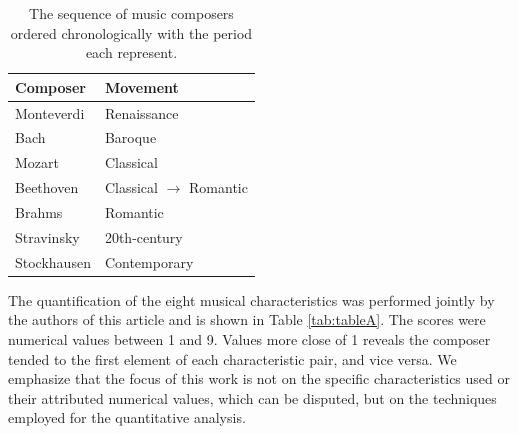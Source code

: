\documentclass[
 aip,
 jmp,
 amsmath,amssymb,
 reprint,
]{revtex4-1}
\begin{document}
\begin{table}[ht]
\caption{\label{tab:table0} The sequence of music composers ordered chronologically
with the period each represent.}

\begin{tabular}{|l||l|}
\hline

 Composer       &  Movement \\ \hline

 Monteverdi      & Renaissance \\
 Bach            & Baroque \\
 Mozart          & Classical \\
 Beethoven       & Classical $\to$ Romantic \\
 Brahms          & Romantic \\
 Stravinsky      & 20th-century \\
 Stockhausen     & Contemporary\\

\hline
\end{tabular}
\end{table}

The quantification of the eight musical
characteristics was performed jointly by the authors of this
article and is shown in Table \ref{tab:tableA}. The scores were
numerical values between 1 and 9. Values more close of 1 reveals the
composer tended to the first element of each characteristic pair, and
vice versa. We emphasize that the focus of this work is not on the specific 
characteristics used or their attributed numerical values,
which can be disputed, but on the techniques employed for the quantitative analysis.
\end{document}
